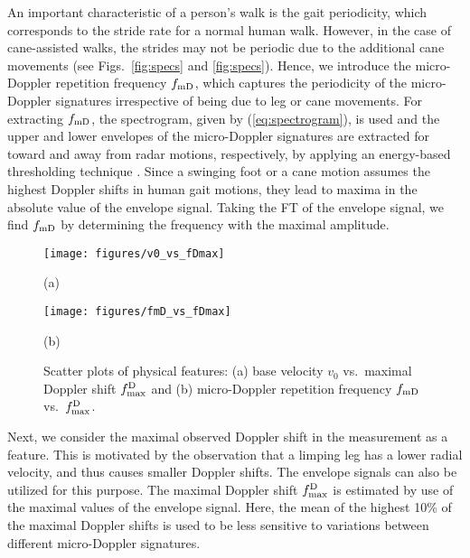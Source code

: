 An important characteristic of a person's walk is the gait periodicity, which corresponds to the stride rate for a normal human walk. However, in the case of cane-assisted walks, the strides may not be periodic due to the additional cane movements (see Figs.~\ref{fig:specs} and \ref{fig:specs}). Hence, we introduce the micro-Doppler repetition frequency ${f_\text{mD}}$, which captures the periodicity of the micro-Doppler signatures irrespective of being due to leg or cane movements. For extracting ${f_\text{mD}}$, the spectrogram, given by (\ref{eq:spectrogram}), is used and the upper and lower envelopes of the micro-Doppler signatures are extracted for toward and away from radar motions, respectively, by applying an energy-based thresholding technique \cite{Ero16}. Since a swinging foot or a cane motion assumes the highest Doppler shifts in human gait motions, they lead to maxima in the absolute value of the envelope signal. 
Taking the FT of the envelope signal, we find ${f_\text{mD}}$ by determining the frequency with the maximal amplitude.

\begin{figure}[!t]
	\begin{minipage}{\columnwidth} %
		\texttt{[image: figures/v0\_vs\_fDmax]}
		\caption*{(a)\label{fig:f0_vs_v0}}
	\end{minipage}
	\begin{minipage}{\columnwidth}
		\texttt{[image: figures/fmD\_vs\_fDmax]}
		\caption*{(b)\label{fig:f0_vs_fdmax}}
	\end{minipage}
	\caption{Scatter plots of physical features: (a) base velocity $v_0$ vs.~maximal Doppler shift ${f^\mathrm{D}_\text{max}}$ and (b) micro-Doppler repetition frequency ${f_\text{mD}}$ vs.~${f^\mathrm{D}_\text{max}}$. \label{fig:scatterPhyFeat}\vspace{-0.5em}}
\end{figure}

Next, we consider the maximal observed Doppler shift in the measurement as a feature. This is motivated by the observation that a limping leg has a lower radial velocity, and thus causes smaller Doppler shifts. The envelope signals can also be utilized for this purpose. The maximal Doppler shift ${f^\mathrm{D}_\text{max}}$ is estimated by use of the maximal values of the envelope signal. Here, the mean of the highest 10\% of the maximal Doppler shifts is used to be less sensitive to variations between different micro-Doppler signatures. 


